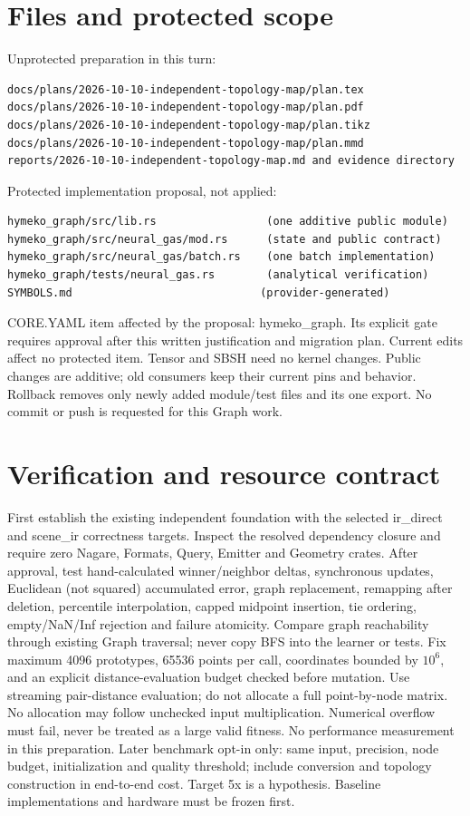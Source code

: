 \documentclass{article}
\begin{document}
\section*{Files and protected scope}
Unprotected preparation in this turn:
\begin{verbatim}
docs/plans/2026-10-10-independent-topology-map/plan.tex
docs/plans/2026-10-10-independent-topology-map/plan.pdf
docs/plans/2026-10-10-independent-topology-map/plan.tikz
docs/plans/2026-10-10-independent-topology-map/plan.mmd
reports/2026-10-10-independent-topology-map.md and evidence directory
\end{verbatim}
Protected implementation proposal, not applied:
\begin{verbatim}
hymeko_graph/src/lib.rs                 (one additive public module)
hymeko_graph/src/neural_gas/mod.rs      (state and public contract)
hymeko_graph/src/neural_gas/batch.rs    (one batch implementation)
hymeko_graph/tests/neural_gas.rs        (analytical verification)
SYMBOLS.md                             (provider-generated)
\end{verbatim}
CORE.YAML item affected by the proposal: hymeko\_graph. Its explicit gate
requires approval after this written justification and migration plan.
Current edits affect no protected item. Tensor and SBSH need no kernel changes.
Public changes are additive; old consumers keep their current pins and behavior.
Rollback removes only newly added module/test files and its one export.
No commit or push is requested for this Graph work.
\section*{Verification and resource contract}
First establish the existing independent foundation with the selected
ir\_direct and scene\_ir correctness targets. Inspect the resolved dependency
closure and require zero Nagare, Formats, Query, Emitter and Geometry crates.
After approval, test hand-calculated winner/neighbor deltas, synchronous updates,
Euclidean (not squared) accumulated error, graph replacement, remapping after
deletion, percentile interpolation, capped midpoint insertion, tie ordering,
empty/NaN/Inf rejection and failure atomicity. Compare graph reachability through
existing Graph traversal; never copy BFS into the learner or tests.
Fix maximum 4096 prototypes, 65536 points per call, coordinates bounded by
$10^6$, and an explicit distance-evaluation budget checked before mutation.
Use streaming pair-distance evaluation; do not allocate a full point-by-node
matrix. No allocation may follow unchecked input multiplication. Numerical
overflow must fail, never be treated as a large valid fitness.
No performance measurement in this preparation. Later benchmark opt-in only:
same input, precision, node budget, initialization and quality threshold;
include conversion and topology construction in end-to-end cost. Target 5x is
a hypothesis. Baseline implementations and hardware must be frozen first.
\end{document}
